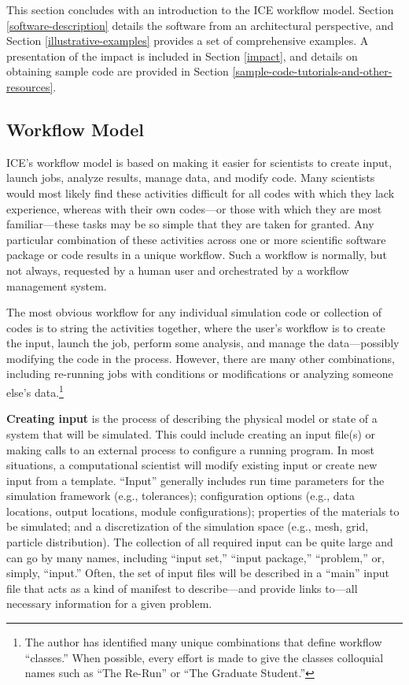 This section concludes with an introduction to the ICE workflow model. Section \ref{software-description} details the software
from an architectural perspective, and Section \ref{illustrative-examples}
provides a set of comprehensive examples. A
presentation of the impact is included in Section \ref{impact}, and details on obtaining sample 
code are provided in Section \ref{sample-code-tutorials-and-other-resources}.

\subsection{Workflow Model}\label{workflow-model}

ICE's workflow model is based on making it easier for scientists to create
input, launch jobs, analyze results, manage data, and modify code. Many
scientists would most likely find these activities difficult for all codes with
which they lack experience, whereas with their own codes---or those with which
they are most familiar---these tasks may be so simple that they are taken for
granted. Any particular combination of these activities across one or more
scientific software package or code results in a unique workflow. Such a
workflow is normally, but not always, requested by a human user and
orchestrated by a workflow management system.

The most obvious workflow for any individual simulation code or
collection of codes is to string the activities together, where the user's
workflow is to create the input, launch the job, perform some analysis,
and manage the data---possibly modifying the code in the process. However, 
there are many other combinations, including re-running jobs with
conditions or modifications or analyzing someone else's data.\footnote{The
author has identified many unique combinations that
define workflow ``classes.'' When possible, every effort is made to give the
classes colloquial names such as ``The Re-Run'' or ``The Graduate Student.''}

\textbf{Creating input} is the process of describing the physical model
or state of a system that will be simulated. This could include creating
an input file(s) or making calls to an external process to configure a
running program. In most situations, a computational scientist will
modify existing input or create new input from a template. ``Input''
generally includes run time parameters for the simulation framework
(e.g., tolerances); configuration options (e.g., data locations, output
locations, module configurations); properties of the materials to be
simulated; and a discretization of the simulation space (e.g., mesh,
grid, particle distribution). The collection of all required input can
be quite large and can go by many names, including ``input set,''
``input package,'' ``problem,'' or, simply, ``input.'' Often, the set of
input files will be described in a ``main'' input file that acts as a
kind of manifest to describe---and provide links to---all necessary
information for a given problem.

